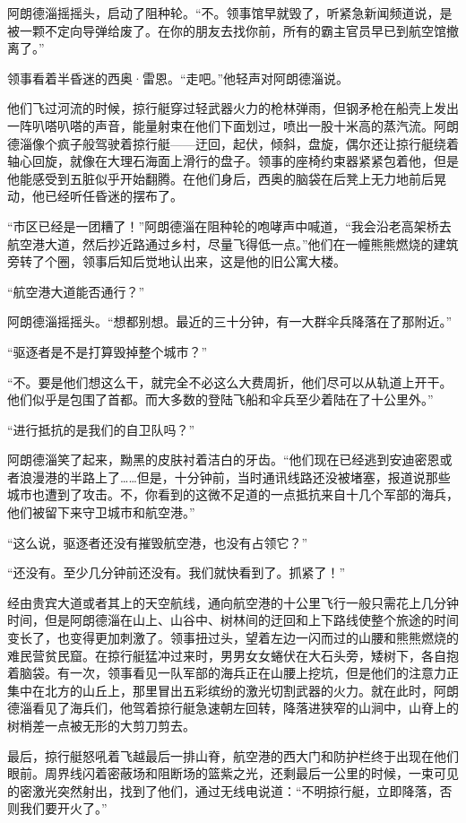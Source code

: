 \documentclass[AutoFakeBold=true]{book}
\begin{document}
阿朗德淄摇摇头，启动了阻种轮。``不。领事馆早就毁了，听紧急新闻频道说，是被一颗不定向导弹给废了。在你的朋友去找你前，所有的霸主官员早已到航空馆撤离了。''

领事看着半昏迷的西奥·雷恩。``走吧。''他轻声对阿朗德淄说。

他们飞过河流的时候，掠行艇穿过轻武器火力的枪林弹雨，但钢矛枪在船壳上发出一阵叭嗒叭嗒的声音，能量射束在他们下面划过，喷出一股十米高的蒸汽流。阿朗德淄像个疯子般驾驶着掠行艇——迂回，起伏，倾斜，盘旋，偶尔还让掠行艇绕着轴心回旋，就像在大理石海面上滑行的盘子。领事的座椅约束器紧紧包着他，但是他能感受到五脏似乎开始翻腾。在他们身后，西奥的脑袋在后凳上无力地前后晃动，他已经听任昏迷的摆布了。

``市区已经是一团糟了！''阿朗德淄在阻种轮的咆哮声中喊道，``我会沿老高架桥去航空港大道，然后抄近路通过乡村，尽量飞得低一点。''他们在一幢熊熊燃烧的建筑旁转了个圈，领事后知后觉地认出来，这是他的旧公寓大楼。

``航空港大道能否通行？''

阿朗德淄摇摇头。``想都别想。最近的三十分钟，有一大群伞兵降落在了那附近。''

``驱逐者是不是打算毁掉整个城市？''

``不。要是他们想这么干，就完全不必这么大费周折，他们尽可以从轨道上开干。他们似乎是包围了首都。而大多数的登陆飞船和伞兵至少着陆在了十公里外。''

``进行抵抗的是我们的自卫队吗？''

阿朗德淄笑了起来，黝黑的皮肤衬着洁白的牙齿。``他们现在已经逃到安迪密恩或者浪漫港的半路上了……但是，十分钟前，当时通讯线路还没被堵塞，报道说那些城市也遭到了攻击。不，你看到的这微不足道的一点抵抗来自十几个军部的海兵，他们被留下来守卫城市和航空港。''

``这么说，驱逐者还没有摧毁航空港，也没有占领它？''

``还没有。至少几分钟前还没有。我们就快看到了。抓紧了！''

经由贵宾大道或者其上的天空航线，通向航空港的十公里飞行一般只需花上几分钟时间，但是阿朗德淄在山上、山谷中、树林间的迂回和上下路线使整个旅途的时间变长了，也变得更加刺激了。领事扭过头，望着左边一闪而过的山腰和熊熊燃烧的难民营贫民窟。在掠行艇猛冲过来时，男男女女蜷伏在大石头旁，矮树下，各自抱着脑袋。有一次，领事看见一队军部的海兵正在山腰上挖坑，但是他们的注意力正集中在北方的山丘上，那里冒出五彩缤纷的激光切割武器的火力。就在此时，阿朗德淄看见了海兵们，他驾着掠行艇急速朝左回转，降落进狭窄的山涧中，山脊上的树梢差一点被无形的大剪刀剪去。

最后，掠行艇怒吼着飞越最后一排山脊，航空港的西大门和防护栏终于出现在他们眼前。周界线闪着密蔽场和阻断场的篮紫之光，还剩最后一公里的时候，一束可见的密激光突然射出，找到了他们，通过无线电说道：``不明掠行艇，立即降落，否则我们要开火了。''
\end{document}
